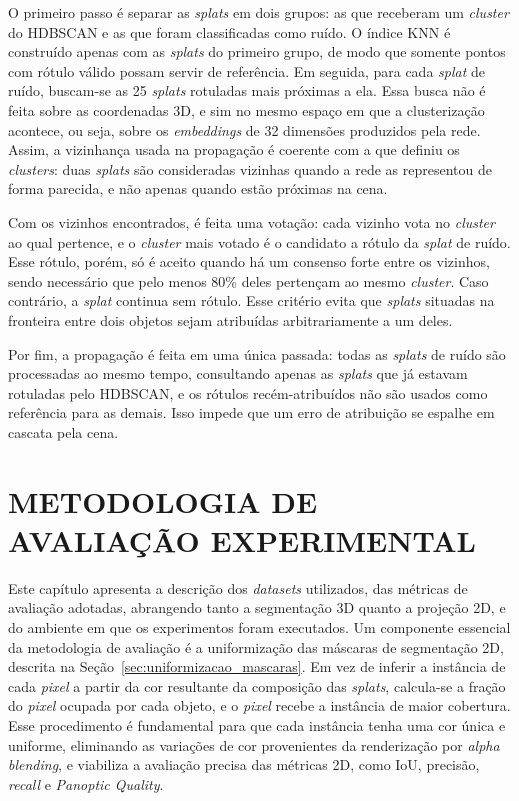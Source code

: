 O primeiro passo é separar as \emph{splats} em dois grupos: as que receberam um \textit{cluster} do HDBSCAN e as que foram classificadas como ruído. O índice KNN é construído apenas com as \emph{splats} do primeiro grupo, de modo que somente pontos com rótulo válido possam servir de referência. Em seguida, para cada \emph{splat} de ruído, buscam-se as 25 \emph{splats} rotuladas mais próximas a ela. Essa busca não é feita sobre as coordenadas 3D, e sim no mesmo espaço em que a clusterização acontece, ou seja, sobre os \textit{embeddings} de 32 dimensões produzidos pela rede. Assim, a vizinhança usada na propagação é coerente com a que definiu os \textit{clusters}: duas \emph{splats} são consideradas vizinhas quando a rede as representou de forma parecida, e não apenas quando estão próximas na cena.

Com os vizinhos encontrados, é feita uma votação: cada vizinho vota no \textit{cluster} ao qual pertence, e o \textit{cluster} mais votado é o candidato a rótulo da \emph{splat} de ruído. Esse rótulo, porém, só é aceito quando há um consenso forte entre os vizinhos, sendo necessário que pelo menos 80\% deles pertençam ao mesmo \textit{cluster}. Caso contrário, a \emph{splat} continua sem rótulo. Esse critério evita que \emph{splats} situadas na fronteira entre dois objetos sejam atribuídas arbitrariamente a um deles.

Por fim, a propagação é feita em uma única passada: todas as \emph{splats} de ruído são processadas ao mesmo tempo, consultando apenas as \emph{splats} que já estavam rotuladas pelo HDBSCAN, e os rótulos recém-atribuídos não são usados como referência para as demais. Isso impede que um erro de atribuição se espalhe em cascata pela cena.

\chapter{METODOLOGIA DE AVALIAÇÃO EXPERIMENTAL}

Este capítulo apresenta a descrição dos \textit{datasets} utilizados, das métricas de avaliação adotadas, abrangendo tanto a segmentação 3D quanto a projeção 2D, e do ambiente em que os experimentos foram executados. Um componente essencial da metodologia de avaliação é a uniformização das máscaras de segmentação 2D, descrita na Seção~\ref{sec:uniformizacao_mascaras}. Em vez de inferir a instância de cada \textit{pixel} a partir da cor resultante da composição das \emph{splats}, calcula-se a fração do \textit{pixel} ocupada por cada objeto, e o \textit{pixel} recebe a instância de maior cobertura. Esse procedimento é fundamental para que cada instância tenha uma cor única e uniforme, eliminando as variações de cor provenientes da renderização por \textit{alpha blending}, e viabiliza a avaliação precisa das métricas 2D, como IoU, precisão, \textit{recall} e \textit{Panoptic Quality}.

